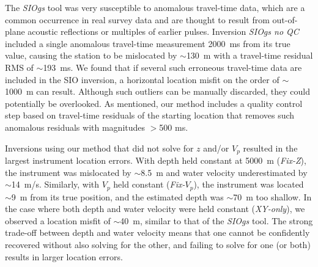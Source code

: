 The \textit{SIOgs} tool was very susceptible to anomalous travel-time data, which are a common occurrence in real survey data and are thought to result from out-of-plane acoustic reflections or multiples of earlier pulses. Inversion \textit{SIOgs no QC} included a single anomalous travel-time measurement 2000~ms from its true value, causing the station to be mislocated by $\sim$130~m with a travel-time residual RMS of $\sim$193~ms. We found that if several such erroneous travel-time data are included in the SIO inversion, a horizontal location misfit on the order of $\sim$1000~m can result. Although such outliers can be manually discarded, they could potentially be overlooked. As mentioned, our method includes a quality control step based on travel-time residuals of the starting location that removes such anomalous residuals with magnitudes $>$500 ms.

Inversions using our method that did not solve for $z$ and/or $V_p$ resulted in the largest instrument location errors. With depth held constant at 5000~m (\textit{Fix-Z}), the instrument was mislocated by $\sim$8.5~m and water velocity underestimated by $\sim$14~m/s. Similarly, with $V_p$ held constant (\textit{Fix-$V_p$}), the instrument was located $\sim$9~m from its true position, and the estimated depth was $\sim$70~m too shallow. In the case where both depth and water velocity were held constant (\textit{XY-only}), we observed a location misfit of $\sim$40~m, similar to that of the \textit{SIOgs} tool. The strong trade-off between depth and water velocity means that one cannot be confidently recovered without also solving for the other, and failing to solve for one (or both) results in larger location errors.


